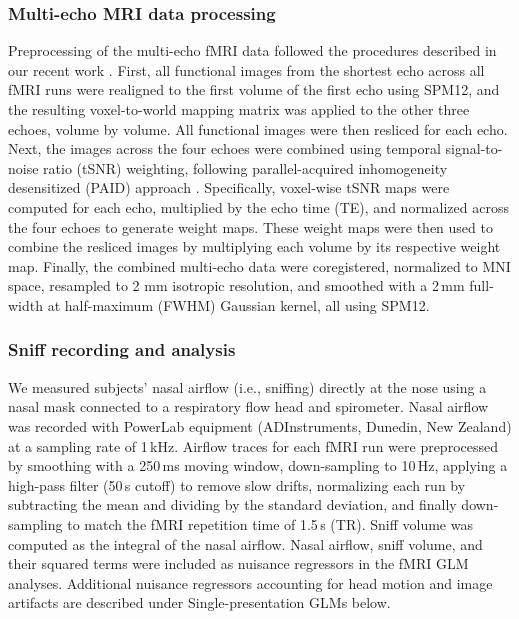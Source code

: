 \documentclass[12pt,letterpaper]{article}
\begin{document}
\subsubsection*{Multi-echo MRI data processing}

Preprocessing of the multi-echo fMRI data followed the procedures described in our recent work \citep{liu2025distinct}. First, all functional images from the shortest echo across all fMRI runs were realigned to the first volume of the first echo using SPM12, and the resulting voxel-to-world mapping matrix was applied to the other three echoes, volume by volume. All functional images were then resliced for each echo. Next, the images across the four echoes were combined using temporal signal-to-noise ratio (tSNR) weighting, following parallel-acquired inhomogeneity desensitized (PAID) approach \citep{RN524}. Specifically, voxel-wise tSNR maps were computed for each echo, multiplied by the echo time (TE), and normalized across the four echoes to generate weight maps. These weight maps were then used to combine the resliced images by multiplying each volume by its respective weight map. Finally, the combined multi-echo data were coregistered, normalized to MNI space, resampled to 2 mm isotropic resolution, and smoothed with a 2\,mm full-width at half-maximum (FWHM) Gaussian kernel, all using SPM12.

\subsubsection*{Sniff recording and analysis}

We measured subjects’ nasal airflow (i.e., sniffing) directly at the nose using a nasal mask connected to a respiratory flow head and spirometer. Nasal airflow was recorded with PowerLab equipment (ADInstruments, Dunedin, New Zealand) at a sampling rate of 1\,kHz. Airflow traces for each fMRI run were preprocessed by smoothing with a 250\,ms moving window, down-sampling to 10\,Hz, applying a high-pass filter (50\,s cutoff) to remove slow drifts, normalizing each run by subtracting the mean and dividing by the standard deviation, and finally down-sampling to match the fMRI repetition time of 1.5\,s (TR). Sniff volume was computed as the integral of the nasal airflow. Nasal airflow, sniff volume, and their squared terms were included as nuisance regressors in the fMRI GLM analyses. Additional nuisance regressors accounting for head motion and image artifacts are described under Single-presentation GLMs below.
\end{document}
